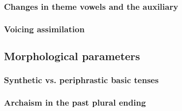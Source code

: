 \subsubsection{Changes in theme vowels and the auxiliary}

\subsubsection{Voicing assimilation}


\subsection{Morphological parameters}

\subsubsection{Synthetic vs. periphrastic basic tenses}

\subsubsection{Archaism in the past plural ending}